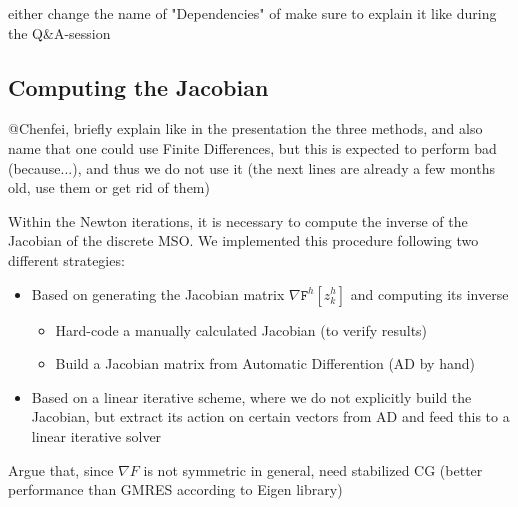 \documentclass[11pt]{scrartcl}
\newcommand{\mSurfDisc}[1]{\ensuremath{\mathtt{F}^h\left[#1\right]}}
\begin{document}
either change the name of "Dependencies" of make sure to explain it like during the Q\&A-session

\subsection{Computing the Jacobian}
@Chenfei, briefly explain like in the presentation the three methods, and also name that one could use Finite Differences, but this is expected to perform bad (because...), and thus we do not use it (the next lines are already a few months old, use them or get rid of them)

Within the Newton iterations, it is necessary to compute the inverse of the Jacobian of the discrete MSO. We implemented this procedure following two different strategies:
\begin{itemize}
	\item Based on generating the Jacobian matrix $\nabla\mSurfDisc{z^h_k}$ and computing its inverse
	\begin{itemize}
		\item Hard-code a manually calculated Jacobian (to verify results)
		\item Build a Jacobian matrix from Automatic Differention (AD by hand)
	\end{itemize}
	\item Based on a linear iterative scheme, where we do not explicitly build the Jacobian, but extract its action on certain vectors from AD and feed this to a linear iterative solver
\end{itemize}

Argue that, since $\nabla F$ is not symmetric in general, need stabilized CG (better performance than GMRES according to Eigen library)
\end{document}
